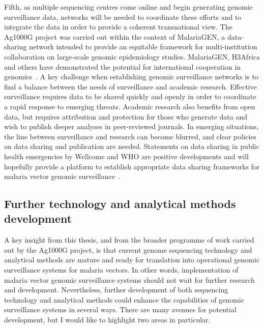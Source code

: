 \begin{refsection}
Fifth, as multiple sequencing centres come online and begin generating genomic surveillance data, networks will be needed to coordinate these efforts and to integrate the data in order to provide a coherent transnational view.
%
The Ag1000G project was carried out within the context of MalariaGEN, a data-sharing network intended to provide an equitable framework for multi-institution collaboration on large-scale genomic epidemiology studies.
%
MalariaGEN, H3Africa and others have demonstrated the potential for international cooperation in genomics~\parencite{Mulder2018}.
%
A key challenge when establishing genomic surveillance networks is to find a balance between the needs of surveillance and academic research.
%
Effective surveillance requires data to be shared quickly and openly in order to coordinate a rapid response to emerging threats.
%
Academic research also benefits from open data, but requires attribution and protection for those who generate data and wish to publish deeper analyses in peer-reviewed journals.
%
In emerging situations, the line between surveillance and research can become blurred, and clear policies on data sharing and publication are needed.
%
Statements on data sharing in public health emergencies by Wellcome and WHO are positive developments and will hopefully provide a platform to establish appropriate data sharing frameworks for malaria vector genomic surveillance~\parencite{WHO2015SDPHE,Dye2016,Wellcome2016,Wellcome2020}.


\subsection{Further technology and analytical methods development}


A key insight from this thesis, and from the broader programme of work carried out by the Ag1000G project, is that current genome sequencing technology and analytical methods are mature and ready for translation into operational genomic surveillance systems for malaria vectors.
%
In other words, implementation of malaria vector genomic surveillance systems should not wait for further research and development.
%
Nevertheless, further development of both sequencing technology and analytical methods could enhance the capabilities of genomic surveillance systems in several ways.
%
There are many avenues for potential development, but I would like to highlight two areas in particular.



\end{refsection}
